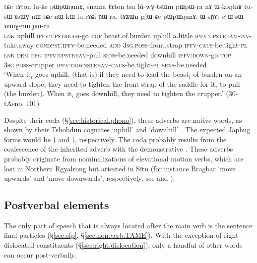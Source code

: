 \begin{exe}
\ex \label{ex:tAton.tAZWn}
\gll tɕe tɤton lu-ɕe pɯpɯŋunɤ, snama tɤton tsa lú-wɣ-tsɯm pɯ\redp{}pɯ-ra nɤ ɯ-koŋtaʁ tu-sɯ-ɤsɯɣ-nɯ tɕe nɯ kɯ lu-rɤɕi ɲɯ-ra.  tɤʑɯn pjɯ-ɕe pɯpɯŋunɤ, ɯ-sɲɤt cʰɯ-sɯ-ɤsɯɣ-nɯ ɲɯ-ra. \\
\textsc{lnk} uphill \textsc{ipfv}:\textsc{upstream}-go \textsc{top} beast.of.burden uphill a.little \textsc{ipfv}:\textsc{upstream}-\textsc{inv}-take.away \textsc{cond}\redp{}\textsc{pst}.\textsc{ipfv}-be.needed \textsc{add} \textsc{3sg}.\textsc{poss}-front.strap \textsc{ipfv}-\textsc{caus}-be.tight-\textsc{pl} \textsc{lnk} \textsc{dem} \textsc{erg} \textsc{ipfv}:\textsc{upstream}-pull \textsc{sens}-be.needed downhill \textsc{ipfv}:\textsc{down}-go \textsc{top} \textsc{3sg}.\textsc{poss}-crupper \textsc{ipfv}:\textsc{downstream}-\textsc{caus}-be.tight-\textsc{pl} \textsc{sens}-be.needed \\
\glt `When it$_i$ goes uphill, (that is) if they need to lead the beast$_i$ of burden on an upward slope, they need to tighten the front strap of the saddle for it$_i$ to pull (the burden). When it$_i$ goes downhill, they need to tighten the crupper.'  (30-tAsno, 101)
\end{exe}

Despite their  coda (§\ref{sec:historical.phono}), these adverbs are native words, as shown by their Tshobdun cognates  `uphill' and  `downhill' \citep[123--4]{jackson19tshobdun}. The expected Japhug forms would be $\dagger$ and $\dagger$, respectively. The coda  probably results from the coalescence of the inherited adverb with the demonstrative . These adverbs probably originate from nominalizations of elevational motion verbs, which are lost in Northern Rgyalrong but attested in Situ (for instance Bragbar  `move upwards' and
 `move downwards', respectively, see \citealt[§9.1]{zhangshuya20these} and \citealt{linyj17space}).

\subsection{Postverbal elements} \label{sec:postverbal.adv}
The only part of speech that is always located after the main verb is the sentence final particles (§\ref{sec:sfp}, §\ref{sec:non.verb.TAME}). With the exception of right dislocated constituents (§\ref{sec:right.dislocation}), only a handful of other words can occur post-verbally.

